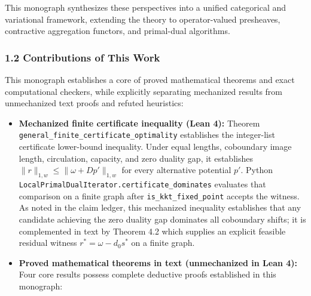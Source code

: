 \documentclass[
]{article}
\providecommand{\tightlist}{%
  \setlength{\itemsep}{0pt}\setlength{\parskip}{0pt}}
\providecommand{\tightlist}{%
  \setlength{\itemsep}{0pt}\setlength{\parskip}{0pt}}
\begin{document}
This monograph synthesizes these perspectives into a unified categorical and variational framework, extending the theory to operator-valued presheaves, contractive aggregation functors, and primal-dual algorithms.

\subsubsection{1.2 Contributions of This Work}\label{contributions-of-this-work}

This monograph establishes a core of proved mathematical theorems and exact computational checkers, while explicitly separating mechanized results from unmechanized text proofs and refuted heuristics:

\begin{itemize}
\tightlist
\item
  \textbf{Mechanized finite certificate inequality (Lean 4):} Theorem \texttt{general\_finite\_certificate\_optimality} establishes the integer-list certificate lower-bound inequality. Under equal lengths, coboundary image length, circulation, capacity, and zero duality gap, it establishes \(\|r\|_{1,w} \le \|\omega + Dp'\|_{1,w}\) for every alternative potential \(p'\). Python \texttt{LocalPrimalDualIterator.certificate\_dominates} evaluates that comparison on a finite graph after \texttt{is\_kkt\_fixed\_point} accepts the witness. As noted in the claim ledger, this mechanized inequality establishes that any candidate achieving the zero duality gap dominates all coboundary shifts; it is complemented in text by Theorem 4.2 which supplies an explicit feasible residual witness \(r^* = \omega - d_0 s^*\) on a finite graph.
\item
  \textbf{Proved mathematical theorems in text (unmechanized in Lean 4):} Four core results possess complete deductive proofs established in this monograph:


\end{itemize}
\end{document}
